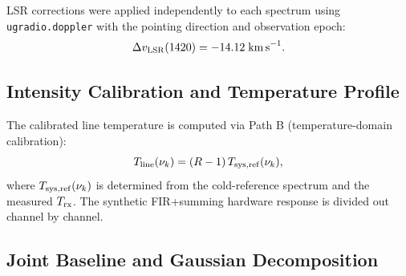\documentclass[10pt,preprint2]{aastex}
\begin{document}
LSR corrections were applied independently to each spectrum
using \texttt{ugradio.doppler} with
the pointing direction and observation epoch:
\begin{equation}
  \Delta v_{\rm LSR}(1420) = -14.12\;\mathrm{km\,s}^{-1}.
\end{equation}

\subsection{Intensity Calibration and Temperature Profile}
\label{sec:tline_calibration}

The calibrated line temperature is computed via Path B
(temperature-domain calibration):
\begin{equation}
  T_{\rm line}(\nu_k) = (R-1)\,T_{\rm sys,ref}(\nu_k),
\end{equation}
where $T_{\rm sys,ref}(\nu_k)$ is determined from the cold-reference spectrum
and the measured $T_{\rm rx}$.
The synthetic FIR+summing hardware response is divided out channel by channel.


\subsection{Joint Baseline and Gaussian Decomposition}
\label{sec:gaussian_fits}
\end{document}
